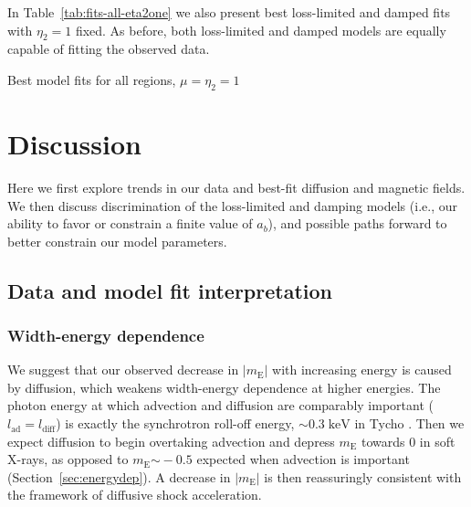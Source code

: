 \documentclass[iop, apj, numberedappendix]{emulateapj}
\newcommand*{\mt}{\mathrm}
\newcommand*{\unit}[1]{\;\mt{#1}}  %
\newcommand*{\abt}{\mathord{\sim}} %
\newcommand*{\mE}{m_\mt{E}}
\begin{document}
In Table~\ref{tab:fits-all-eta2one} we also present best loss-limited and
damped fits with $\eta_2 = 1$ fixed.  As before, both loss-limited and damped
models are equally capable of fitting the observed data.

\begin{table}
    \scriptsize
    \centering
    \caption{Best model fits for all regions, $\mu = \eta_2 = 1$
    \label{tab:fits-all-eta2one}}
    
\end{table}


\section{Discussion}

Here we first explore trends in our data and best-fit diffusion and magnetic
fields.  We then discuss discrimination of the loss-limited and damping models
(i.e., our ability to favor or constrain a finite value of $a_b$), and possible
paths forward to better constrain our model parameters.

\subsection{Data and model fit interpretation}

\subsubsection{Width-energy dependence}

We suggest that our observed decrease in $|\mE|$ with increasing energy is
caused by diffusion, which weakens width-energy dependence at higher energies.
The photon energy at which advection and diffusion are comparably important
($l_{\mt{ad}} = l_{\mt{diff}}$) is exactly the synchrotron roll-off energy,
$\abt 0.3 \unit{keV}$ in Tycho \citep{hwang2002}.  Then we expect diffusion to
begin overtaking advection and depress $\mE$ towards $0$ in soft X-rays, as
opposed to $\mE \abt -0.5$ expected when advection is important
(Section~\ref{sec:energydep}).  A decrease in $|\mE|$ is then reassuringly
consistent with the framework of diffusive shock acceleration.
\end{document}
